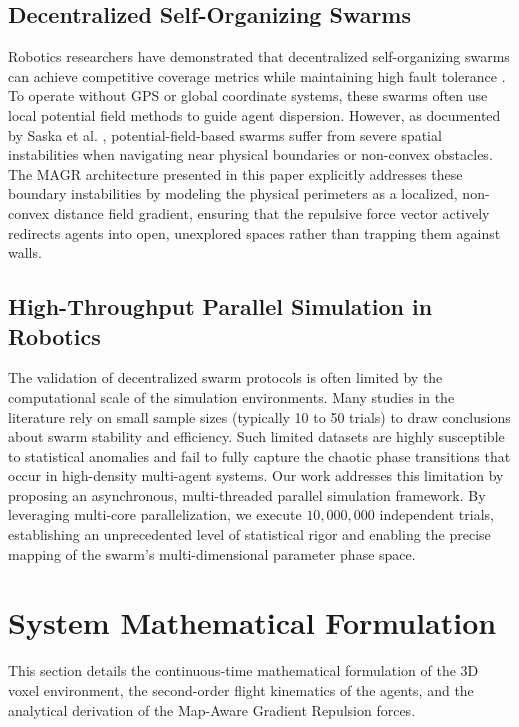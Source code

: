 \documentclass[letterpaper, 10pt, conference]{IEEEtran}
\begin{document}
\subsection{Decentralized Self-Organizing Swarms}
Robotics researchers have demonstrated that decentralized self-organizing swarms can achieve competitive coverage metrics while maintaining high fault tolerance \cite{brambilla2013}. To operate without GPS or global coordinate systems, these swarms often use local potential field methods to guide agent dispersion. However, as documented by Saska et al. \cite{saska2014cooperative}, potential-field-based swarms suffer from severe spatial instabilities when navigating near physical boundaries or non-convex obstacles. The MAGR architecture presented in this paper explicitly addresses these boundary instabilities by modeling the physical perimeters as a localized, non-convex distance field gradient, ensuring that the repulsive force vector actively redirects agents into open, unexplored spaces rather than trapping them against walls.

\subsection{High-Throughput Parallel Simulation in Robotics}
The validation of decentralized swarm protocols is often limited by the computational scale of the simulation environments. Many studies in the literature rely on small sample sizes (typically 10 to 50 trials) to draw conclusions about swarm stability and efficiency. Such limited datasets are highly susceptible to statistical anomalies and fail to fully capture the chaotic phase transitions that occur in high-density multi-agent systems. Our work addresses this limitation by proposing an asynchronous, multi-threaded parallel simulation framework. By leveraging multi-core parallelization, we execute $10{,}000{,}000$ independent trials, establishing an unprecedented level of statistical rigor and enabling the precise mapping of the swarm's multi-dimensional parameter phase space.

\section{System Mathematical Formulation}
\label{sec:formulation}

This section details the continuous-time mathematical formulation of the 3D voxel environment, the second-order flight kinematics of the agents, and the analytical derivation of the Map-Aware Gradient Repulsion forces.
\end{document}
